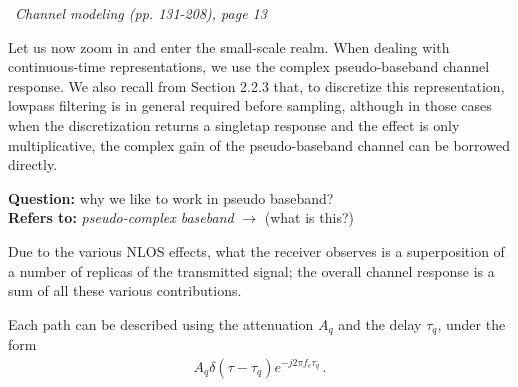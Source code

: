 \documentclass[a4paper, 12pt]{book}
\begin{document}
\begin{yellowbox}
\faBook\ \textit{Channel modeling (pp. 131-208), page 13}

Let us now zoom in and enter the small-scale realm. When dealing with continuous-time representations, we use the complex \textcolor{green!60!black}{pseudo-baseband channel response}. We also recall from Section 2.2.3 that, \textcolor{green!60!black}{to discretize this representation}, lowpass filtering is in general required before sampling, although in those cases when the discretization returns a singletap response and the effect is only multiplicative, the complex gain of the pseudo-baseband channel can be borrowed directly.
\end{yellowbox}

\begin{purplebox}
\textbf{Question:} why we like to work in pseudo baseband? \\
\textbf{Refers to:} \textit{pseudo-complex baseband} $\to$ (what is this?)
\end{purplebox}

Due to the various NLOS effects, what the receiver observes is a superposition of a number of replicas of the transmitted signal; the overall channel response is a sum of all these various contributions.

Each path can be described using the attenuation $A_q$ and the delay $\tau_q$, under the form
\begin{align*}
A_q \delta(\tau - \tau_q) e^{-j 2\pi f_c \tau_q} \,.
\end{align*}
\end{document}
